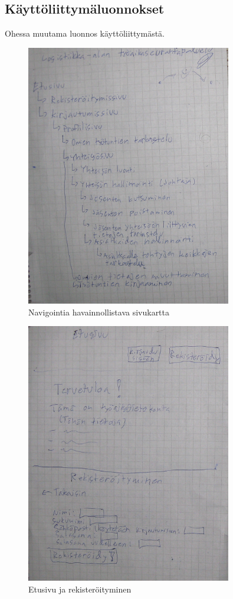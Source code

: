 \documentclass[a4paper, 12pt finnish]{article}
\begin{document}
\subsection{Käyttöliittymäluonnokset}
Ohessa muutama luonnos käyttöliittymästä.
\begin{figure}[htbp]
    \centering
    \includegraphics[width=0.8\textwidth]{sivukartta.png}
    \caption{\small Navigointia havainnollistava sivukartta}
\end{figure}
\begin{figure}[htbp]
    \centering
    \includegraphics[width=0.8\textwidth]{etusivu.png}
    \caption{\small Etusivu ja rekisteröityminen}
\end{figure}
\end{document}
